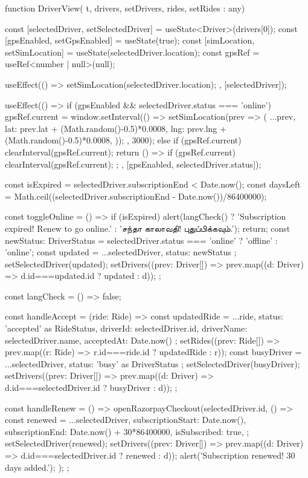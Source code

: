 function DriverView({ t, drivers, setDrivers, rides, setRides }: any) {
  const [selectedDriver, setSelectedDriver] = useState<Driver>(drivers[0]);
  const [gpsEnabled, setGpsEnabled] = useState(true);
  const [simLocation, setSimLocation] = useState(selectedDriver.location);
  const gpsRef = useRef<number | null>(null);

  useEffect(() => {
    setSimLocation(selectedDriver.location);
  }, [selectedDriver]);

  useEffect(() => {
    if (gpsEnabled && selectedDriver.status === 'online') {
      gpsRef.current = window.setInterval(() => {
        setSimLocation(prev => ({
          ...prev,
          lat: prev.lat + (Math.random()-0.5)*0.0008,
          lng: prev.lng + (Math.random()-0.5)*0.0008,
        }));
      }, 3000);
    } else {
      if (gpsRef.current) clearInterval(gpsRef.current);
    }
    return () => { if (gpsRef.current) clearInterval(gpsRef.current); };
  }, [gpsEnabled, selectedDriver.status]);

  const isExpired = selectedDriver.subscriptionEnd < Date.now();
  const daysLeft = Math.ceil((selectedDriver.subscriptionEnd - Date.now())/86400000);

  const toggleOnline = () => {
    if (isExpired) {
      alert(langCheck() ? 'Subscription expired! Renew to go online.' : 'சந்தா காலாவதி! புதுப்பிக்கவும்.');
      return;
    }
    const newStatus: DriverStatus = selectedDriver.status === 'online' ? 'offline' : 'online';
    const updated = { ...selectedDriver, status: newStatus };
    setSelectedDriver(updated);
    setDrivers((prev: Driver[]) => prev.map((d: Driver) => d.id===updated.id ? updated : d));
  };

  const langCheck = () => false;

  const handleAccept = (ride: Ride) => {
    const updatedRide = { ...ride, status: 'accepted' as RideStatus, driverId: selectedDriver.id, driverName: selectedDriver.name, acceptedAt: Date.now() };
    setRides((prev: Ride[]) => prev.map((r: Ride) => r.id===ride.id ? updatedRide : r));
    const busyDriver = { ...selectedDriver, status: 'busy' as DriverStatus };
    setSelectedDriver(busyDriver);
    setDrivers((prev: Driver[]) => prev.map((d: Driver) => d.id===selectedDriver.id ? busyDriver : d));
  };

  const handleRenew = () => {
    openRazorpayCheckout(selectedDriver.id, () => {
      const renewed = {
        ...selectedDriver,
        subscriptionStart: Date.now(),
        subscriptionEnd: Date.now() + 30*86400000,
        isSubscribed: true,
      };
      setSelectedDriver(renewed);
      setDrivers((prev: Driver[]) => prev.map((d: Driver) => d.id===selectedDriver.id ? renewed : d));
      alert('Subscription renewed! 30 days added.');
    });
  };

}
